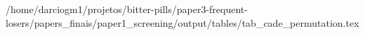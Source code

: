 /home/darciogm1/projetos/bitter-pills/paper3-frequent-losers/papers_finais/paper1_screening/output/tables/tab_cade_permutation.tex